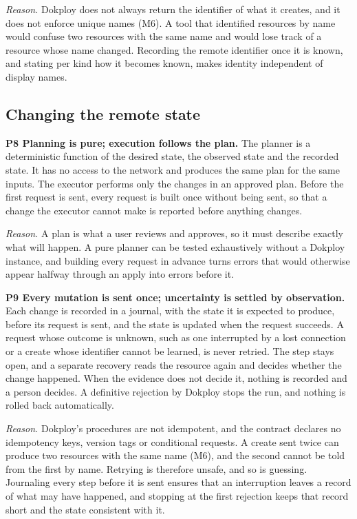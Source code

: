 \emph{Reason.} Dokploy does not always return the identifier of what it creates, and it does not enforce
unique names (M6). A tool that identified resources by name would confuse two resources with the same
name and would lose track of a resource whose name changed. Recording the remote identifier once it is
known, and stating per kind how it becomes known, makes identity independent of display names.

\subsection{Changing the remote state}\label{sec:4.3}

\textbf{P8 Planning is pure; execution follows the plan.} The planner is a deterministic function of the
desired state, the observed state and the recorded state. It has no access to the network and produces
the same plan for the same inputs. The executor performs only the changes in an approved plan. Before
the first request is sent, every request is built once without being sent, so that a change the
executor cannot make is reported before anything changes.

\emph{Reason.} A plan is what a user reviews and approves, so it must describe exactly what will happen.
A pure planner can be tested exhaustively without a Dokploy instance, and building every request in
advance turns errors that would otherwise appear halfway through an apply into errors before it.

\textbf{P9 Every mutation is sent once; uncertainty is settled by observation.} Each change is recorded in a
journal, with the state it is expected to produce, before its request is sent, and the state is
updated when the request succeeds. A request whose outcome is unknown, such as one interrupted by a
lost connection or a create whose identifier cannot be learned, is never retried. The step stays
open, and a separate recovery reads the resource again and decides whether the change happened. When
the evidence does not decide it, nothing is recorded and a person decides. A definitive rejection by
Dokploy stops the run, and nothing is rolled back automatically.

\emph{Reason.} Dokploy's procedures are not idempotent, and the contract declares no idempotency keys, version
tags or conditional requests. A
create sent twice can produce two resources with the same name (M6), and the second cannot be told
from the first by name. Retrying is therefore unsafe, and so is guessing. Journaling every step before
it is sent ensures that an interruption leaves a record of what may have happened, and stopping at the
first rejection keeps that record short and the state consistent with it.

